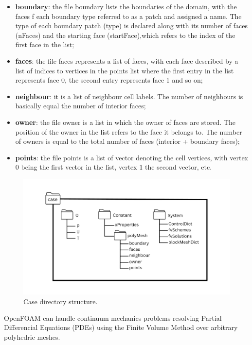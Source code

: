\documentclass[a5paper]{sapthesis}
\begin{document}
	\begin{itemize}
		\item \textbf{boundary}: the file boundary lists the boundaries of the domain, with the faces f each boundary type referred to as a patch and assigned a name. The type of each boundary patch (type) is declared along with its number of faces (nFaces) and the starting face (startFace),which refers to the index of the first face in the list;
		\item \textbf{faces}: the file faces represents a list of faces, with each face described by a list of indices to vertices in the points list where the first entry in the list represents face 0, the second entry represents face 1 and so on;
		\item \textbf{neighbour}: it is a list of neighbour cell labels. The number of neighbours is basically equal  the number of interior faces;
		\item \textbf{owner}: the file owner is a list in which the owner of faces are stored. The position of the owner in the list refers to the face it belongs to. The number of owners is equal to the total number of faces (interior + boundary faces);
		\item \textbf{points}: the file points is a list of vector denoting the cell vertices, with vertex 0 being the first vector in the list, vertex 1 the second vector, etc. 
	\end{itemize}
	
	\begin{figure}
		\centering
		\includegraphics[origin=c, width=0.75 \linewidth]{Figures/Case_directory_structure}
		\caption{Case directory structure.}
		\label{OpenFOAM_directory_structure}
	\end{figure}
	
	\noindent OpenFOAM can handle continuum mechanics problems resolving Partial Differencial Equations (PDEs) using the Finite Volume Method over arbitrary polyhedric meshes.
	
\end{document}
